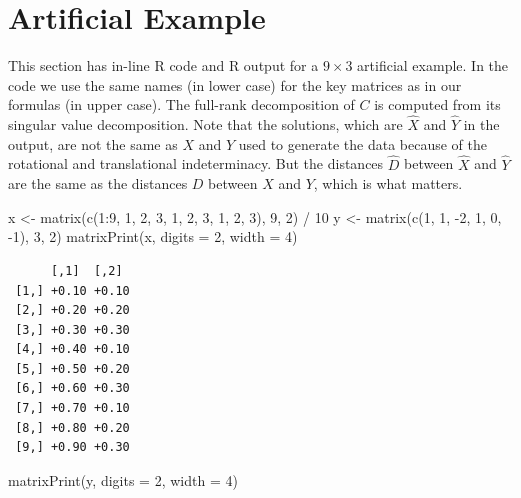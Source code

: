 \documentclass[
  12pt,
  letterpaper,
  DIV=11,
  numbers=noendperiod]{scrartcl}
\newenvironment{Shaded}{\begin{snugshade}}{\end{snugshade}}
\newcommand{\AttributeTok}[1]{\textcolor[rgb]{0.40,0.45,0.13}{#1}}
\newcommand{\DecValTok}[1]{\textcolor[rgb]{0.68,0.00,0.00}{#1}}
\newcommand{\FunctionTok}[1]{\textcolor[rgb]{0.28,0.35,0.67}{#1}}
\newcommand{\NormalTok}[1]{\textcolor[rgb]{0.00,0.23,0.31}{#1}}
\newcommand{\OtherTok}[1]{\textcolor[rgb]{0.00,0.23,0.31}{#1}}
\newcommand{\SpecialCharTok}[1]{\textcolor[rgb]{0.37,0.37,0.37}{#1}}
\newcommand{\sectionbreak}{\clearpage}
\begin{document}
\sectionbreak

\section{Artificial Example}\label{artificial-example}

This section has in-line R code and R output for a \(9 \times 3\)
artificial example. In the code we use the same names (in lower case)
for the key matrices as in our formulas (in upper case). The full-rank
decomposition of \(C\) is computed from its singular value
decomposition. Note that the solutions, which are \(\hat X\) and
\(\hat Y\) in the output, are not the same as \(X\) and \(Y\) used to
generate the data because of the rotational and translational
indeterminacy. But the distances \(\hat D\) between \(\hat X\) and
\(\hat Y\) are the same as the distances \(D\) between \(X\) and \(Y\),
which is what matters.

\begin{Shaded}
\begin{Highlighting}[]
\NormalTok{x }\OtherTok{\textless{}{-}} \FunctionTok{matrix}\NormalTok{(}\FunctionTok{c}\NormalTok{(}\DecValTok{1}\SpecialCharTok{:}\DecValTok{9}\NormalTok{, }\DecValTok{1}\NormalTok{, }\DecValTok{2}\NormalTok{, }\DecValTok{3}\NormalTok{, }\DecValTok{1}\NormalTok{, }\DecValTok{2}\NormalTok{, }\DecValTok{3}\NormalTok{, }\DecValTok{1}\NormalTok{, }\DecValTok{2}\NormalTok{, }\DecValTok{3}\NormalTok{), }\DecValTok{9}\NormalTok{, }\DecValTok{2}\NormalTok{) }\SpecialCharTok{/} \DecValTok{10}
\NormalTok{y }\OtherTok{\textless{}{-}} \FunctionTok{matrix}\NormalTok{(}\FunctionTok{c}\NormalTok{(}\DecValTok{1}\NormalTok{, }\DecValTok{1}\NormalTok{, }\SpecialCharTok{{-}}\DecValTok{2}\NormalTok{, }\DecValTok{1}\NormalTok{, }\DecValTok{0}\NormalTok{, }\SpecialCharTok{{-}}\DecValTok{1}\NormalTok{), }\DecValTok{3}\NormalTok{, }\DecValTok{2}\NormalTok{)}
\FunctionTok{matrixPrint}\NormalTok{(x, }\AttributeTok{digits =} \DecValTok{2}\NormalTok{, }\AttributeTok{width =} \DecValTok{4}\NormalTok{)}
\end{Highlighting}
\end{Shaded}

\begin{verbatim}
      [,1]  [,2] 
 [1,] +0.10 +0.10
 [2,] +0.20 +0.20
 [3,] +0.30 +0.30
 [4,] +0.40 +0.10
 [5,] +0.50 +0.20
 [6,] +0.60 +0.30
 [7,] +0.70 +0.10
 [8,] +0.80 +0.20
 [9,] +0.90 +0.30
\end{verbatim}

\begin{Shaded}
\begin{Highlighting}[]
\FunctionTok{matrixPrint}\NormalTok{(y, }\AttributeTok{digits =} \DecValTok{2}\NormalTok{, }\AttributeTok{width =} \DecValTok{4}\NormalTok{)}
\end{Highlighting}
\end{Shaded}
\end{document}
